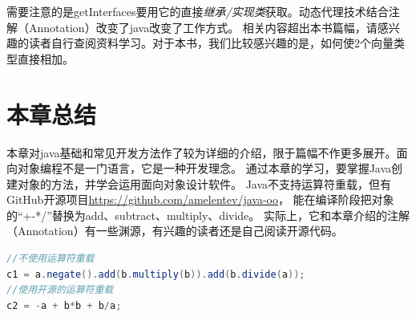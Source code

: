 需要注意的是getInterfaces要用它的直接\emph{继承/实现类}获取。动态代理技术结合注解（Annotation）改变了java改变了工作方式。
相关内容超出本书篇幅，请感兴趣的读者自行查阅资料学习。对于本书，我们比较感兴趣的是，如何使2个向量类型直接相加。

\section{本章总结}
本章对java基础和常见开发方法作了较为详细的介绍，限于篇幅不作更多展开。面向对象编程不是一门语言，它是一种开发理念。
通过本章的学习，要掌握Java创建对象的方法，并学会运用面向对象设计软件。
Java不支持运算符重载，但有GitHub开源项目\url{https://github.com/amelentev/java-oo}，
能在编译阶段把对象的“+-*/”替换为add、subtract、multiply、divide。
实际上，它和本章介绍的注解（Annotation）有一些渊源，有兴趣的读者还是自己阅读开源代码。

\begin{lstlisting}[language=Java,mathescape]
//不使用运算符重载
c1 = a.negate().add(b.multiply(b)).add(b.divide(a));
//使用开源的运算符重载
c2 = -a + b*b + b/a;
\end{lstlisting}
